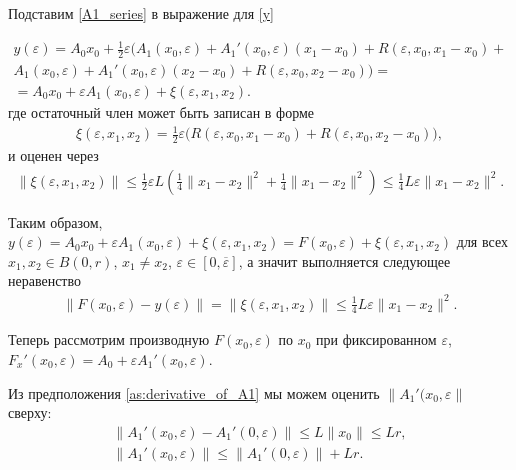 \documentclass[../main.tex]{subfiles}
\begin{document}
Подставим \eqref{A1_series} в выражение для \eqref{y}

\begin{gather*}
	y(\varepsilon) =
	A_0x_0 +
	\frac{1}{2}\varepsilon \Big(
	A_1(x_0,\varepsilon) +
	A_1'(x_0,\varepsilon)(x_1 - x_0)+ 
	R(\varepsilon, x_0, x_1 - x_0) + \\ 
	A_1(x_0,\varepsilon) +
	A_1'(x_0,\varepsilon)(x_2 - x_0)+ 
	R(\varepsilon, x_0, x_2 - x_0)
	\Big) = \\ = 
	A_0x_0 + 
	\varepsilon A_1(x_0,\varepsilon) +
	\xi(\varepsilon,x_1,x_2).
\end{gather*}
где остаточный член может быть записан в форме
\begin{gather*}
	\xi(\varepsilon,x_1,x_2) = \frac{1}{2}\varepsilon\big(R(\varepsilon, x_0, x_1 - x_0) + R(\varepsilon, x_0, x_2 - x_0)\big),
\end{gather*}
и оценен через
\begin{gather*}
	\|\xi(\varepsilon,x_1,x_2)\| \leqslant \frac{1}{2}\varepsilon L \left(\frac{1}{4}\|x_1 - x_2\|^2 + \frac{1}{4}\|x_1 - x_2\|^2 \right) \leqslant \frac{1}{4}L\varepsilon\|x_1 - x_2\|^2.   
\end{gather*}

Таким образом, $y(\varepsilon) = A_0x_0 + \varepsilon A_1(x_0,\varepsilon) + \xi(\varepsilon,x_1,x_2) = F(x_0,\varepsilon) + \xi(\varepsilon,x_1,x_2)$ для всех $x_1, x_2 \in B(0,r)$, $x_1 \neq x_2$, $\varepsilon \in [0, \overline{\varepsilon}]$, а значит выполняется следующее неравенство
\begin{gather*}
	\| F(x_0,\varepsilon) - y(\varepsilon) \| = \|\xi(\varepsilon,x_1,x_2)\| \leqslant \frac{1}{4}L\varepsilon\|x_1-x_2\|^2.
\end{gather*}


Теперь рассмотрим производную $F(x_0, \varepsilon)$ по $x_0$ при фиксированном $\varepsilon$, $F_x'(x_0,\varepsilon) = A_0 + \varepsilon A_1'(x_0,\varepsilon) $.

Из предположения \ref{as:derivative_of_A1} мы можем оценить $\|A_1'(x_0,\varepsilon\|$ сверху:
\begin{gather*}
	\|A_1'(x_0,\varepsilon) - A_1'(0,\varepsilon)\| \leqslant 
	L\|x_0\| \leqslant
	L r, \\
	\|A_1'(x_0,\varepsilon)\|  \leqslant \| A_1'(0,\varepsilon)\| + Lr.
\end{gather*}
\end{document}
